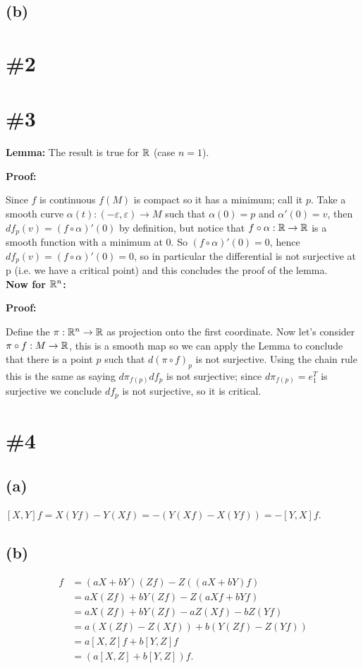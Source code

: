 \documentclass{article}
\begin{document}
\subsection*{(b)}
\section*{\#2}
\section*{\#3}
\textbf{Lemma:} The result is true for $\mathbb{R}$ (case $n=1$).

\textbf{Proof:}

	Since $f$ is continuous $f(M)$ is compact so
	it has a minimum; call it $p$. Take a smooth
	curve
	$\alpha(t):(-\varepsilon,\varepsilon)\to M$
	such that $\alpha(0)=p$ and $\alpha'(0)=v$,
	then $df_p(v)=(f\circ \alpha)'(0)$ by
	definition, but notice that $f\circ\alpha:\mathbb{R}
	\to\mathbb{R}$ is a smooth function with a minimum at
	0. So $(f\circ \alpha)'(0)=0$, hence
	$df_p(v)=(f\circ \alpha)'(0)=0$, so in
	particular the differential is not surjective
	at p (i.e. we have a critical point) and this
	concludes the proof of the lemma.\\
	\textbf{Now for $\mathbb{R}^n$:}

\textbf{Proof:}

	Define the $\pi:\mathbb{R}^n\to\mathbb{R}$ as projection onto
	the first coordinate. Now let's consider
	$\pi\circ f:M\to\mathbb{R}$, this is a smooth map so
	we can apply the Lemma to conclude that there
	is a point $p$ such that $d(\pi\circ f)_p$ is
	not surjective. Using the chain rule this is
	the same as saying $d\pi_{f(p)}df_p$ is not
	surjective; since $d\pi_{f(p)}=e_1^T$ is
	surjective we conclude $df_p$ is not
	surjective, so it is critical.

\section*{\#4}
\subsection*{(a)}
$[X,Y]f=X(Yf)-Y(Xf)=-(Y(Xf)-X(Yf))=-[Y,X]f$.
\subsection*{(b)}
\begin{align*}
[aX+bY,Z]f
&=(aX+bY)(Zf)-Z((aX+bY)f)\\
&=aX(Zf)+bY(Zf)-Z(aXf+bYf)\\
&=aX(Zf)+bY(Zf)-aZ(Xf)-bZ(Yf)\\
&=a(X(Zf)-Z(Xf))+b(Y(Zf)-Z(Yf))\\
&=a[X,Z]f+b[Y,Z]f\\
&=(a[X,Z]+b[Y,Z])f.
\end{align*}
\end{document}

